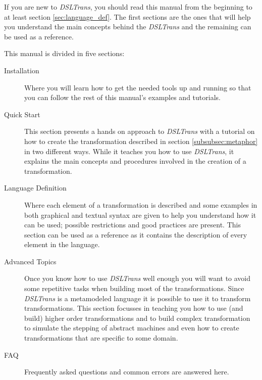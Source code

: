 If you are new to \emph{DSLTrans}, you should read
this manual from the beginning to at least section \ref{sec:language_def}. The
first sections are the ones that will help you understand the main concepts
behind the \emph{DSLTrans} and the remaining can be used as a reference.

This manual is divided in five sections:

\begin{description}
  \item[Installation] Where you will learn how to get the needed
  tools up and running so that you can follow the rest of this manual's examples
  and tutorials.
  \item[Quick Start] This section presents a hands on approach to
  \emph{DSLTrans} with a tutorial on how to create the transformation described
  in section \ref{subsubsec:metaphor} in two different ways. While it teaches
  you how to use \emph{DSLTrans}, it explains the main concepts and procedures
  involved in the creation of a transformation.
  \item[Language Definition] Where each element of a transformation is described
  and some examples in both graphical and textual syntax are given to help you
  understand how it can be used; possible restrictions and good practices are
  present. This section can be used as a reference as it contains the
  description of every element in the language.
  \item[Advanced Topics] Once you know how to use \emph{DSLTrans} well enough
  you will want to avoid some repetitive tasks when building most of the
  transformations. Since \emph{DSLTrans} is a metamodeled language it is
  possible to use it to transform transformations. This section focusses in
  teaching you how to use (and build) higher order transformations and to build
  complex transformation to simulate the stepping of abstract machines and even
  how to create transformations that are specific to some domain.
  \item[FAQ] Frequently asked questions and common errors are
  answered here.
\end{description}

\clearpage